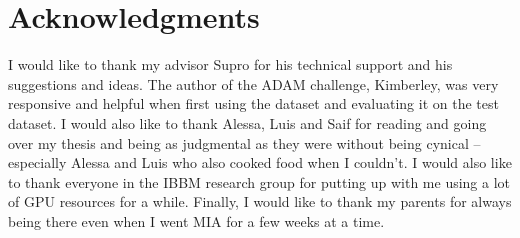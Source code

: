 \chapter*{Acknowledgments}
\thispagestyle{empty}

I would like to thank my advisor Supro for his technical support and his suggestions and ideas. The author of the ADAM challenge, Kimberley, was very responsive and helpful when first using the dataset and evaluating it on the test dataset. I would also like to thank Alessa, Luis and Saif for reading and going over my thesis and being as judgmental as they were without being cynical -- especially Alessa and Luis who also cooked food when I couldn't. I would also like to thank everyone in the IBBM research group for putting up with me using a lot of GPU resources for a while. Finally, I would like to thank my parents for always being there even when I went MIA for a few weeks at a time.

\cleardoublepage{}
